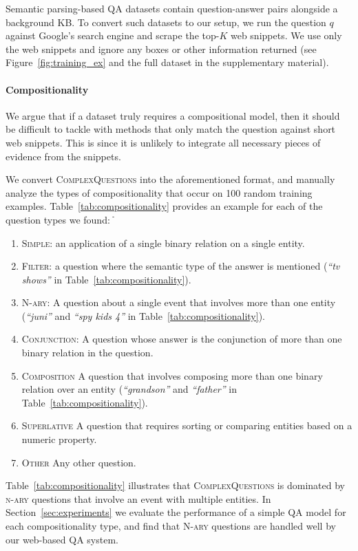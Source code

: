 \documentclass[11pt,a4paper]{article}
\newcommand\nl[1]{{\it``#1''}}
\begin{document}
Semantic parsing-based QA datasets contain question-answer pairs alongside a background KB. To convert such datasets to our setup, we run the question $q$ against Google's search engine and scrape the top-$K$ web snippets. We use only the web snippets and ignore any boxes or other information returned (see Figure~\ref{fig:training_ex} and the full dataset in the supplementary material).

\paragraph{Compositionality}
We argue that if a dataset truly requires a compositional model, then it should be difficult to tackle with methods that only match the question against short web snippets. This is since it is unlikely to integrate all necessary pieces of evidence from the snippets.

We convert \textsc{ComplexQuestions} into the aforementioned format, and manually analyze the types of compositionality that occur on 100 random training examples. Table~\ref{tab:compositionality} provides an example for each of the  question types we found:
ֿ\begin{enumerate}[topsep=0pt,itemsep=0pt,partopsep=0pt,parsep=0pt]
\item[] \textsc{Simple}: an application of a single binary relation on a single entity.
\item[] \textsc{Filter}: a question where the semantic type of the answer is mentioned (\nl{tv shows} in Table~\ref{tab:compositionality}).
\item[] \textsc{N-ary}: A question about a single event that involves more than one entity (\nl{juni} and \nl{spy kids 4} in Table~\ref{tab:compositionality}).
\item[] \textsc{Conjunction}: A question whose answer is the conjunction of more than one binary relation in the question.
\item[] \textsc{Composition} A question that involves composing more than one binary relation over an entity (\nl{grandson} and \nl{father} in Table~\ref{tab:compositionality}).
\item[] \textsc{Superlative} A question that requires sorting or comparing entities based on a numeric property.
\item[] \textsc{Other} Any other question.
\end{enumerate}

Table~\ref{tab:compositionality} illustrates that \textsc{ComplexQuestions} is dominated by \textsc{n-ary} questions that involve an event with multiple entities. In Section~\ref{sec:experiments} we evaluate the performance of a simple QA model for each compositionality type, and find that \textsc{N-ary} questions are handled well by our web-based QA system.
\end{document}
